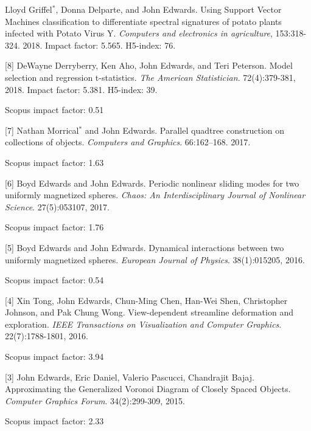 \documentclass[margin,line]{res}
\newcommand{\pubunder}[1]{#1}
\newcommand{\jnum}[1]{[#1]}
\begin{document}
\begin{resume}
\jnum{9} Lloyd Griffel$^*$, Donna Delparte, and John Edwards. Using Support Vector Machines classification to differentiate spectral signatures of potato plants infected with Potato Virus Y. \textit{Computers and electronics in agriculture}, 153:318-324. 2018. Impact factor: 5.565. H5-index: 76.

\jnum{8} DeWayne Derryberry, Ken Aho, \pubunder{John Edwards}, and Teri Peterson. Model selection and regression t-statistics. \textit{The American Statistician}. 72(4):379-381, 2018. Impact factor: 5.381. H5-index: 39.
\begin{IMPACT}
Scopus impact factor: 0.51 %
\end{IMPACT}

\jnum{7} Nathan Morrical$^*$ and \pubunder{John Edwards}. Parallel quadtree construction on collections of objects. \textit{Computers and Graphics}. 66:162–168. 2017.
\begin{IMPACT}
Scopus impact factor: 1.63 %
\end{IMPACT}

\jnum{6} Boyd Edwards and \pubunder{John Edwards}. Periodic nonlinear sliding modes for two uniformly magnetized spheres. \textit{Chaos: An Interdisciplinary Journal of Nonlinear Science}. 27(5):053107, 2017.
\begin{IMPACT}
Scopus impact factor: 1.76 %
\end{IMPACT}

\jnum{5} Boyd Edwards and \pubunder{John Edwards}. Dynamical interactions between two uniformly magnetized spheres. \textit{European Journal of Physics}. 38(1):015205, 2016.
\begin{IMPACT}
Scopus impact factor: 0.54 %
\end{IMPACT}

\jnum{4} Xin Tong, \pubunder{John Edwards}, Chun-Ming Chen, Han-Wei Shen, Christopher Johnson, and Pak Chung Wong. View-dependent streamline deformation and exploration. \textit{IEEE Transactions on Visualization and Computer Graphics}. 22(7):1788-1801, 2016.
\begin{IMPACT}
Scopus impact factor: 3.94 %
\end{IMPACT}

\jnum{3} \pubunder{John Edwards}, Eric Daniel, Valerio Pascucci, Chandrajit Bajaj. Approximating the Generalized Voronoi Diagram of Closely Spaced Objects. \textit{Computer Graphics Forum}. 34(2):299-309, 2015.
\begin{IMPACT}
Scopus impact factor: 2.33 %
\end{IMPACT}


\end{resume}
\end{document}
